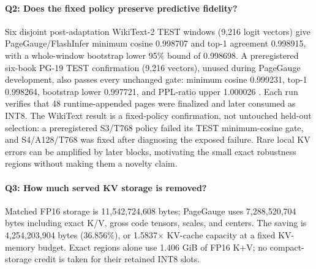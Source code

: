 \documentclass{article}
\newcommand{\method}{PageGauge}
\begin{document}
\paragraph{Q2: Does the fixed policy preserve predictive fidelity?}
Six disjoint post-adaptation WikiText-2 TEST windows (9,216 logit vectors) give
PageGauge/FlashInfer minimum cosine 0.998707 and top-1 agreement 0.998915, with
a whole-window bootstrap lower 95\% bound of 0.998698.  A preregistered
six-book PG-19 TEST confirmation (9,216 vectors), unused during \method{}
development, also passes every unchanged gate: minimum cosine 0.999231, top-1
0.998264, bootstrap lower 0.997721, and PPL-ratio upper 1.000026
\citep{rae2019compressive}.  Each run verifies that 48 runtime-appended pages
were finalized and later consumed as INT8.  The WikiText result is a
fixed-policy confirmation, not untouched held-out selection: a preregistered
S3/T768 policy failed its TEST minimum-cosine gate, and S4/A128/T768 was fixed
after diagnosing the exposed failure.  Rare local KV errors can be amplified
by later blocks, motivating the small exact robustness regions without making
them a novelty claim.

\begin{table}[t]
\centering
\caption{Final results.  Served bytes and latency use the B4 performance
protocol; fidelity uses the B1 quality protocol (versus HF for FP16 and matched
FP16 for PageGauge).  CI is the hierarchical cache-neutral wall interval.
``48 INT8'' denotes runtime-appended pages later attended through INT8.}
\label{tab:main}
\scriptsize
\setlength{\tabcolsep}{2.1pt}
\end{table}

\paragraph{Q3: How much served KV storage is removed?}
Matched FP16 storage is 11,542,724,608 bytes; PageGauge uses 7,288,520,704
bytes including exact K/V, gross code tensors, scales, and centers.  The saving
is 4,254,203,904 bytes (36.856\%), or 1.5837$\times$ KV-cache capacity at a
fixed KV-memory budget.  Exact regions alone use 1.406 GiB of FP16 K+V; no compact-storage credit is taken for
their retained INT8 slots.
\end{document}
